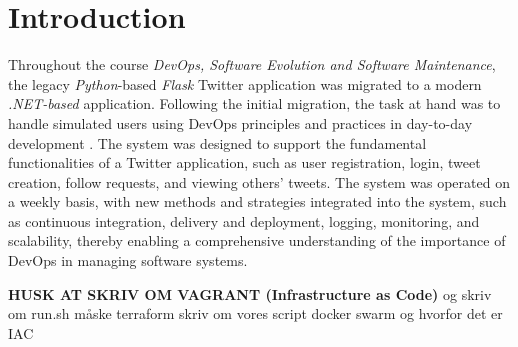 \chapter{Introduction}

Throughout the course \textit{DevOps, Software Evolution and Software Maintenance}, the legacy \textit{Python}-based \textit{Flask} Twitter application was migrated to a modern \textit{.NET-based} application. Following the initial migration, the task at hand was to handle simulated users using DevOps principles and practices in day-to-day development \cite{kim2016devops}. The system was designed to support the fundamental functionalities of a Twitter application, such as user registration, login, tweet creation, follow requests, and viewing others' tweets. The system was operated on a weekly basis, with new methods and strategies integrated into the system, such as continuous integration, delivery and deployment, logging, monitoring, and scalability, thereby enabling a comprehensive understanding of the importance of DevOps in managing software systems.

\textbf{HUSK AT SKRIV OM VAGRANT (Infrastructure as Code)}
og skriv om run.sh
måske terraform
skriv om vores script docker swarm og hvorfor det er IAC
